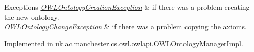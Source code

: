 \begin{DoxyExceptions}{Exceptions}
{\em \hyperlink{classorg_1_1semanticweb_1_1owlapi_1_1model_1_1_o_w_l_ontology_creation_exception}{O\-W\-L\-Ontology\-Creation\-Exception}} & if there was a problem creating the new ontology. \\
\hline
{\em \hyperlink{classorg_1_1semanticweb_1_1owlapi_1_1model_1_1_o_w_l_ontology_change_exception}{O\-W\-L\-Ontology\-Change\-Exception}} & if there was a problem copying the axioms. \\
\hline
\end{DoxyExceptions}


Implemented in \hyperlink{classuk_1_1ac_1_1manchester_1_1cs_1_1owl_1_1owlapi_1_1_o_w_l_ontology_manager_impl_a6141a2e7b94c89f4c7ae34fcb84ec000}{uk.\-ac.\-manchester.\-cs.\-owl.\-owlapi.\-O\-W\-L\-Ontology\-Manager\-Impl}.

